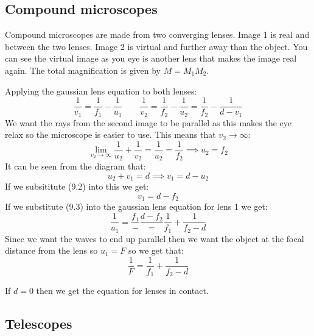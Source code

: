 \subsection*{Compound microscopes}

Compound microscopes are made from two converging lenses. Image 1 is real and between the two lenses. Image 2 is virtual and further away than the object. You can see the virtual image as you eye is another lens that makes the image real again. The total magnification is given by \(M=M_1M_2\).

\begin{center}
\end{center} 

Applying the gaussian lens equation to both lenses:
\[\frac{1}{v_1}=\frac{1}{f_1}-\frac{1}{u_1}\qquad\frac{1}{v_2}=\frac{1}{f_2}-\frac{1}{u_2}=\frac{1}{f_2}-\frac{1}{d-v_1}\]
We want the rays from the second image to be parallel as this makes the eye relax so the microscope is easier to use. This means that \(v_2\to\infty\):
\[\lim_{v_2\to\infty}\frac{1}{u_2}+\frac{1}{v_2}=\frac{1}{u_2}=\frac{1}{f_2}\implies u_2=f_2\tag{9.2}\]
It can be seen from the diagram that:
\[u_2+v_1=d\implies v_1=d-u_2\]
If we subsititute (9.2) into this we get:
\[v_1=d-f_2\tag{9.3}\]
If we substitute (9.3) into the gaussian lens equation for lens 1 we get:
\[\frac{1}{u_1}=\frac{f_1}-\frac{d-f_2}=\frac{1}{f_1}+\frac{1}{f_2-d}\]
Since we want the waves to end up parallel then we want the object at the focal distance from the lens so \(u_1=F\) so we get that:
\[\frac 1F= \frac{1}{f_1}+\frac{1}{f_2-d}\]

If \(d=0\) then we get the equation for lenses in contact.

\subsection*{Telescopes}

